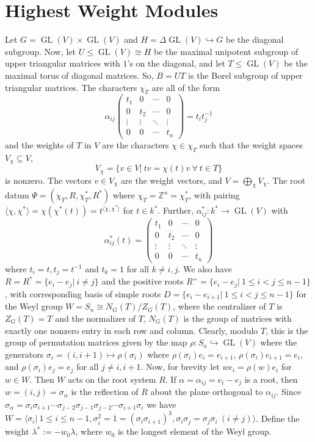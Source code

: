 \documentclass[11pt,oneside]{amsbook}
\numberwithin{equation}{section}
\theoremstyle{plain}
\theoremstyle{definition}
\theoremstyle{remark}
\newcommand{\ZZ}{\mathbb{Z}}
\DeclareMathOperator{\GL}{\mathrm{GL}}
\newcommand{\la}{\langle}
\newcommand{\ra}{\rangle}
\begin{document}
					\section{Highest Weight Modules}
					Let $G=\GL(V) \times \GL(V)$ and $H= \Delta \GL(V) \hookrightarrow G$ be the diagonal subgroup. 
					Now, let $U \leq \GL(V) \cong H$ be the maximal unipotent subgroup of upper triangular matrices with $1$'s on the diagonal, and let $T \leq \GL(V)$ be the maximal torus of diagonal matrices. So, $B = UT$ is the Borel subgroup of upper triangular matrices. The characters $\chi_T$ are all of the form
					\[ \alpha_{ij} \begin{pmatrix}
						t_1 & 0 &  \cdots & 0 \\
						0 & t_2 &  \cdots & 0 \\
						\vdots & \vdots & \ddots & \vdots \\
						0 & 0 & \cdots & t_n
					\end{pmatrix} = t_it_j^{-1} \]
					and the weights of $T$ in $V$ are the characters $\chi \in \chi_T$ such that the weight spaces $V_{\chi} \subseteq V$, 
					\[ V_{\chi} = \{v \in V|\ tv = \chi(t)v \ \forall \ t \in T \} \]
					is nonzero. The vectors $v \in V_{\chi}$ are the weight vectors, and $V = \bigoplus_{\chi} V_{\chi}$. The root 
					datum $\Psi = (\chi_T, R, \chi^*_T, R^*)$ where $\chi_T = \ZZ^n = \chi^*_T$, with pairing $\la \chi, \chi^* \ra 
					= \chi(\chi^*(t)) = t^{\la \chi, \chi^* \ra}$ for $t \in k^*$. Further, $\alpha_{ij}^*: k^* \to \GL(V)$ with 
					\[\alpha_{ij}^*(t) = \begin{pmatrix}
						t_1 & 0 &  \cdots & 0 \\
						0 & t_2 &  \cdots & 0 \\
						\vdots & \vdots & \ddots & \vdots \\
						0 & 0 & \cdots & t_n
					\end{pmatrix} \]
					where $t_i = t, t_j = t^{-1}$ and $t_k = 1$ for all $k \neq i,j$. We also have $R = R^* = \{e_i-e_j|\ i \neq j \}$ and the positive roots $R^+ = \{e_i-e_j|\ 1 \leq i < j \leq n-1 \}$, with corresponding basis of simple roots $D = \{e_i-e_{i+1}|\ 1 \leq i<j \leq n-1 \}$ for the Weyl group $W=S_n \cong N_G(T)/Z_G(T)$, where the centralizer of $T$ is $Z_G(T)=T$ and the normalizer of $T$, $N_G(T)$ is the group of matrices with exactly one nonzero entry in each row and column. Clearly, modulo $T$, this is the group of permutation matrices given by the map $\rho:S_n \hookrightarrow \GL(V)$ where the generators $\sigma_i = (i,i+1) \mapsto \rho(\sigma_i)$ where $\rho(\sigma_i)e_i = e_{i+1}$, $\rho(\sigma_i)e_{i+1} = e_i$, and $\rho(\sigma_i)e_j = e_j$ for all $j \neq i,i+1$. Now, for brevity let $we_i = \rho(w)e_i$ for $w \in W$. Then $W$ acts on the root system $R$. If $\alpha = \alpha_{ij} = e_i-e_j$ is a root, then $w = (i,j) = \sigma_{\alpha}$ is the reflection of $R$ about the plane orthogonal to $\alpha_{ij}$. Since $\sigma_{\alpha} = \sigma_i \sigma_{i+1} \cdots \sigma_{j-2}\sigma_{j-1}\sigma_{j-2} \cdots \sigma_{i+1}\sigma_i$ we have $W=\la \sigma_i| \ 1 \leq i \leq n-1, \sigma_i^2=1=(\sigma_i\sigma_{i+1})^3, \sigma_i\sigma_j=\sigma_j\sigma_i \ (i \neq j) \ra$. 
					Define the weight $\lambda^* := -w_0\lambda$, where $w_0$ is the longest element of the Weyl group. 
					
\end{document}
